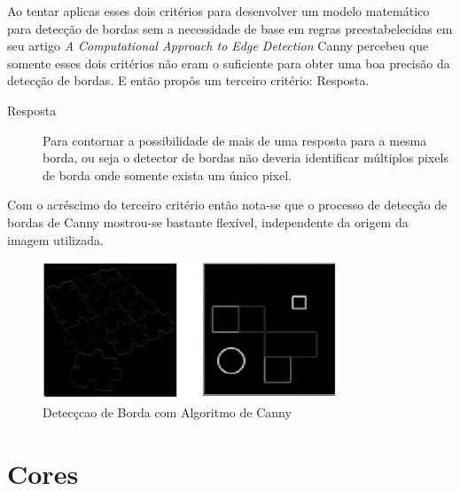 Ao tentar aplicas esses dois critérios para desenvolver um modelo matemático para detecção de bordas sem a necessidade de base em regras preestabelecidas em seu artigo
\textit{ A Computational Approach to Edge Detection} Canny percebeu que somente esses dois critérios não eram o suficiente para obter uma boa precisão da detecção de bordas. E então propôs um terceiro critério: Resposta.
\begin{description}
	\item[Resposta] Para contornar a possibilidade de mais de uma resposta para a mesma borda, ou seja o detector de bordas não deveria identificar múltiplos pixels de borda onde somente exista um único pixel. \cite{Wangenheim:2014, Canny:1986, Vale:2002}
\end{description}


Com o acréscimo do terceiro critério então nota-se que o processo de detecção de bordas de Canny
mostrou-se bastante flexível, independente da origem da imagem utilizada\cite{Vale:2002}.
 \begin{figure}[!h]
	\centering
	\includegraphics[width=0.8\textwidth]{canny.pdf}
	\caption{Detecçcao de Borda com Algoritmo de Canny \cite{Saini:2013} }
	\label{Canny}
\end{figure}







\section{Cores} \label{Sec:Cores}


